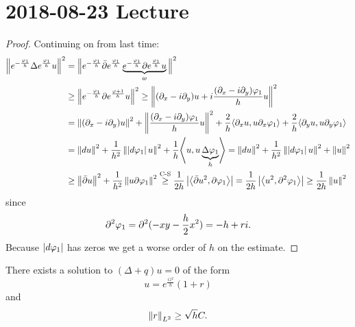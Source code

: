\section{2018-08-23 Lecture}

\begin{proof}
  Continuing on from last time:
  \begin{align*}
    \norm{ e^{-\frac{\ph_1} h}\Delta e^\frac{\ph_1} h u}^2 &= \Big\Vert e^{-\frac{\ph_1}h} \bar\p e^\frac{\ph_1}h \underbrace{e^{-\frac{\ph_1}h} \p e^\frac{\ph_1}h u}_w \Big\Vert^2 \\
    &\geq \norm{ e^{-\frac{\ph_1}h}\p e^\frac{\ph+1}h u}^2 \geq \norm{ (\p_x-i\p_y)u + i\frac{(\p_x-i\p_y)\ph_1}h u}^2  \\
      &= \norm{(\p_x-i\p_y)u}^2 + \norm{\frac{(\p_x-i\p_y)\ph_1}hu}^2 + \frac 2h \ang{\p_x u, u \p_x\ph_1} + \frac 2h \ang{\p_y u, u\p_y \ph_1} \\
      &= \norm{du}^2 + \frac{1}{h^2} \norm{\abs{d\ph_1}u}^2 + \frac 1h \ang{u,u\underbrace{\Delta\ph_1}_h} = \norm{du}^2 + \frac 1{h^2} \norm{\abs{d\ph_1}u}^2 + \norm{u}^2\\
      &\geq \norm{\bar\p u}^2 + \frac 1{h^2} \norm{u\p\ph_1}^2 \overset{\text{C-S}}{\geq} \frac 1{2h} \abs{\ang{\bar\p u^2,\p\ph_1}} = \frac 1{2h} \abs{\ang{u^2,\p^2\ph_1}} \geq \frac 1{2h} \norm{u}^2
  \end{align*}
  since
  \[ \p^2\ph_1 = \p^2(-xy-\frac h2 x^2) = -h+ri. \]
  Because $\abs{d\ph_1}$ has zeros we get a worse order of $h$ on the estimate.
\end{proof}

\begin{prop}
  There exists a solution to $(\Delta+q)u=0$ of the form
  \[ u=e^{\frac{iz^2}h}(1+r) \]
  and
  \[ \norm{r}_{L^2} \geq \sqrt h C. \]
\end{prop}

